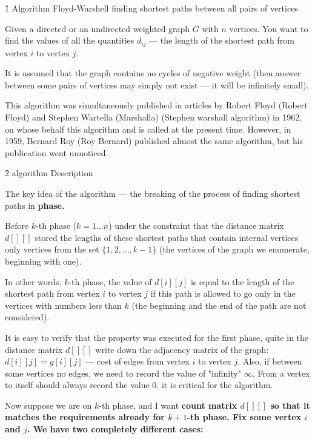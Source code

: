 \h1{ Algorithm Floyd-Warshell finding shortest paths between all pairs of vertices }

Given a directed or an undirected weighted graph $G$ with $n$ vertices. You want to find the values of all the quantities $d_{ij}$ --- the length of the shortest path from vertex $i$ to vertex $j$.

It is assumed that the graph contains no cycles of negative weight (then answer between some pairs of vertices may simply not exist --- it will be infinitely small).

This algorithm was simultaneously published in articles by Robert Floyd (Robert Floyd) and Stephen Wartella (Marshalla) (Stephen warshall algorithm) in 1962, on whose behalf this algorithm and is called at the present time. However, in 1959, Bernard Roy (Roy Bernard) published almost the same algorithm, but his publication went unnoticed.


\h2{ algorithm Description }

The key idea of the algorithm --- the breaking of the process of finding shortest paths in \bf{phase}.

Before $k$-th phase ($k = 1 \ldots n$) under the constraint that the distance matrix $d[][]$ stored the lengths of these shortest paths that contain internal vertices only vertices from the set $\{ 1, 2, \ldots, k-1 \}$ (the vertices of the graph we enumerate, beginning with one).

In other words, $k$-th phase, the value of $d[i][j]$ is equal to the length of the shortest path from vertex $i$ to vertex $j$ if this path is allowed to go only in the vertices with numbers less than $k$ (the beginning and the end of the path are not considered).

It is easy to verify that the property was executed for the first phase, quite in the distance matrix $d[][]$ write down the adjacency matrix of the graph: $d[i][j] = g[i][j]$ --- cost of edges from vertex $i$ to vertex $j$. Also, if between some vertices no edges, we need to record the value of "infinity" $\infty$. From a vertex to itself should always record the value $0$, it is critical for the algorithm.

Now suppose we are on $k$-th phase, and I want \bf{count} matrix $d[][]$ so that it matches the requirements already for $k+1$-th phase. Fix some vertex $i$ and $j$. We have two completely different cases:

